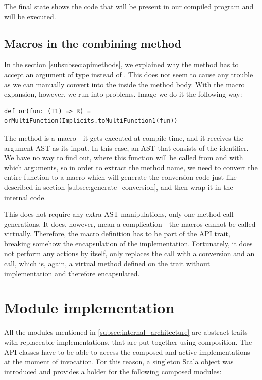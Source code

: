 The final state shows the code that will be present in our compiled program and will be executed.

\subsection{Macros in the combining method}

In the section \ref{subsubsec:apimethods}, we explained why the  method has to accept an argument of  type instead of . This does not seem to cause any trouble as we can manually convert  into the  inside the method body. With the macro expansion, however, we run into problems. Image we do it the following way:
\lstset{style=Scala}
\begin{lstlisting}
def or(fun: (T1) => R) = orMultiFunction(Implicits.toMultiFunction1(fun))
\end{lstlisting}

The   method is a macro - it gets executed at compile time, and it receives the argument AST as its input. In this case, an AST that consists of the  identifier. We have no way to find out, where this function will be called from and with which arguments, so in order to extract the method name, we need to convert the entire  function to a macro which will generate the conversion code just like described in section \ref{subsec:generate_conversion}, and then wrap it in the internal  code.

This does not require any extra AST manipulations, only one method call generations. It does, however, mean a complication - the macros cannot be called virtually. Therefore, the macro definition has to be part of the  API trait, breaking somehow the encapsulation of the implementation. Fortunately, it does not perform any actions by itself, only replaces the  call with a conversion and an  call, which is, again, a virtual method defined on the trait without implementation and therefore encapsulated.


\section{Module implementation}
\label{sec:module_impl}

All the modules mentioned in \ref{subsec:internal_architecture} are abstract traits with replaceable implementations, that are put together using composition. The API classes have to be able to access the composed and active implementations at the moment of invocation. For this reason, a singleton Scala object  was introduced and provides a holder for the following composed modules:

